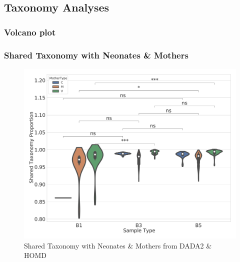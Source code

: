 \documentclass{beamer}
\begin{document}
    \subsection{Taxonomy Analyses}
    \begin{frame}
        \frametitle{Volcano plot}
    \end{frame}

    \begin{frame}
        \frametitle{Shared Taxonomy with Neonates \& Mothers}

        \begin{figure}
            \includegraphics[width=0.6 \linewidth]{figures/Step40/everything/everything.DADA2.homd.pdf}
            \caption{Shared Taxonomy with Neonates \& Mothers from DADA2 \& HOMD}
        \end{figure}
    \end{frame}
\end{document}
